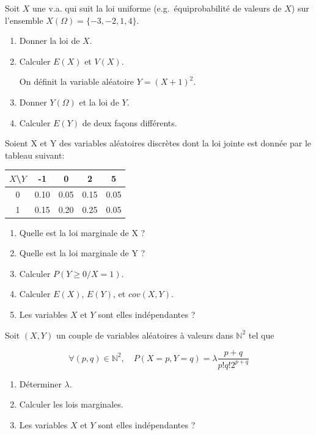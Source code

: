 \documentclass[]{book}
\theoremstyle{magentacolor}
\theoremstyle{proprie}
\theoremstyle{exstyle}
\theoremstyle{exostyle}
\theoremstyle{definition}
\theoremstyle{definition}
\theoremstyle{definition}
\theoremstyle{remark}
\let\BeginKnitrBlock\begin \let\EndKnitrBlock\end
\begin{document}
\BeginKnitrBlock{exercise}
\protect\hypertarget{exr:unnamed-chunk-69}{}{\label{exr:unnamed-chunk-69} }Soit \(X\) une v.a. qui suit la loi uniforme (e.g.~équiprobabilité de
valeurs de \(X\)) sur l'ensemble \(X(\Omega) = \{-3, -2, 1, 4\}\).

\begin{enumerate}
\def\labelenumi{\arabic{enumi}.}
\item
  Donner la loi de \(X\).
\item
  Calculer \(E(X)\) et \(V(X)\).

  On définit la variable aléatoire \(Y=(X+1)^2\).
\item
  Donner \(Y(\Omega)\) et la loi de \(Y\).
\item
  Calculer \(E(Y)\) de deux façons différents.
\end{enumerate}
\EndKnitrBlock{exercise}

\BeginKnitrBlock{exercise}
\protect\hypertarget{exr:unnamed-chunk-70}{}{\label{exr:unnamed-chunk-70} }Soient X et Y des variables aléatoires discrètes dont la loi jointe est
donnée par le tableau suivant:

\begin{longtable}[]{@{}ccccc@{}}
\toprule
\(X\)\textbackslash{}\(Y\) & -1 & 0 & 2 & 5\tabularnewline
\midrule
\endhead
0 & 0.10 & 0.05 & 0.15 & 0.05\tabularnewline
1 & 0.15 & 0.20 & 0.25 & 0.05\tabularnewline
\bottomrule
\end{longtable}

\begin{enumerate}
\def\labelenumi{\arabic{enumi}.}
\item
  Quelle est la loi marginale de X ?
\item
  Quelle est la loi marginale de Y ?
\item
  Calculer \(P(Y \geq 0 / X = 1)\).
\item
  Calculer \(E(X)\), \(E(Y)\), et \(cov(X,Y)\).
\item
  Les variables \(X\) et \(Y\) sont elles indépendantes ?
\end{enumerate}
\EndKnitrBlock{exercise}

\BeginKnitrBlock{exercise}
\protect\hypertarget{exr:unnamed-chunk-71}{}{\label{exr:unnamed-chunk-71} }Soit \((X,Y)\) un couple de variables aléatoires à valeurs dans
\(\mathbb{N}^2\) tel que

\[\forall (p,q) \in \mathbb{N}^2, \quad P(X=p,Y=q) = \lambda \frac{p+q}{p! q! 2^{p+q}}\]

\begin{enumerate}
\def\labelenumi{\arabic{enumi}.}
\item
  Déterminer \(\lambda\).
\item
  Calculer les lois marginales.
\item
  Les variables \(X\) et \(Y\) sont elles indépendantes ?
\end{enumerate}
\EndKnitrBlock{exercise}
\end{document}
